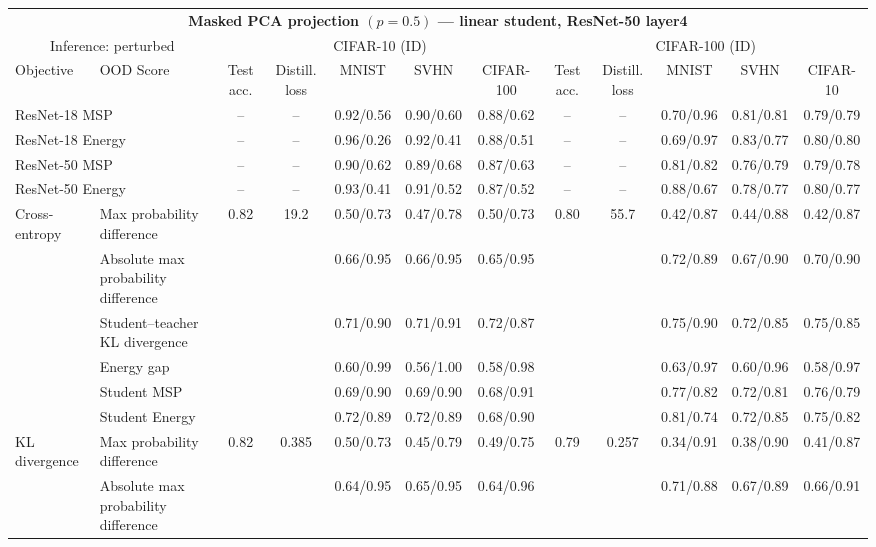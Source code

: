 \documentclass[border=2pt]{standalone}
\begin{document}
\scriptsize
\setlength{\tabcolsep}{4pt}
\begin{tabular}{llcccccccccc}
\multicolumn{12}{c}{\textbf{Masked PCA projection $(p=0.5)$ --- linear student, ResNet-50 layer4}}\\[4pt]
\multicolumn{2}{c}{Inference: perturbed} & \multicolumn{5}{c}{CIFAR-10 (ID)} & \multicolumn{5}{c}{CIFAR-100 (ID)} \\
\cmidrule(lr){3-7} \cmidrule(lr){8-12}
\toprule
Objective & OOD Score & Test acc. & Distill. loss & MNIST & SVHN & CIFAR-100 & Test acc. & Distill. loss & MNIST & SVHN & CIFAR-10 \\
\midrule
\multicolumn{2}{l}{ResNet-18 MSP} & -- & -- & 0.92/0.56 & 0.90/0.60 & 0.88/0.62 & -- & -- & 0.70/0.96 & 0.81/0.81 & 0.79/0.79 \\
\multicolumn{2}{l}{ResNet-18 Energy} & -- & -- & 0.96/0.26 & 0.92/0.41 & 0.88/0.51 & -- & -- & 0.69/0.97 & 0.83/0.77 & 0.80/0.80 \\
\multicolumn{2}{l}{ResNet-50 MSP} & -- & -- & 0.90/0.62 & 0.89/0.68 & 0.87/0.63 & -- & -- & 0.81/0.82 & 0.76/0.79 & 0.79/0.78 \\
\multicolumn{2}{l}{ResNet-50 Energy} & -- & -- & 0.93/0.41 & 0.91/0.52 & 0.87/0.52 & -- & -- & 0.88/0.67 & 0.78/0.77 & 0.80/0.77 \\
\midrule
Cross-entropy & Max probability difference & 0.82 & 19.2 & 0.50/0.73 & 0.47/0.78 & 0.50/0.73 & 0.80 & 55.7 & 0.42/0.87 & 0.44/0.88 & 0.42/0.87 \\
 & Absolute max probability difference &  &  & 0.66/0.95 & 0.66/0.95 & 0.65/0.95 &  &  & 0.72/0.89 & 0.67/0.90 & 0.70/0.90 \\
 & Student--teacher KL divergence &  &  & 0.71/0.90 & 0.71/0.91 & 0.72/0.87 &  &  & 0.75/0.90 & 0.72/0.85 & 0.75/0.85 \\
 & Energy gap &  &  & 0.60/0.99 & 0.56/1.00 & 0.58/0.98 &  &  & 0.63/0.97 & 0.60/0.96 & 0.58/0.97 \\
 & Student MSP &  &  & 0.69/0.90 & 0.69/0.90 & 0.68/0.91 &  &  & 0.77/0.82 & 0.72/0.81 & 0.76/0.79 \\
 & Student Energy &  &  & 0.72/0.89 & 0.72/0.89 & 0.68/0.90 &  &  & 0.81/0.74 & 0.72/0.85 & 0.75/0.82 \\
\addlinespace
KL divergence & Max probability difference & 0.82 & 0.385 & 0.50/0.73 & 0.45/0.79 & 0.49/0.75 & 0.79 & 0.257 & 0.34/0.91 & 0.38/0.90 & 0.41/0.87 \\
 & Absolute max probability difference &  &  & 0.64/0.95 & 0.65/0.95 & 0.64/0.96 &  &  & 0.71/0.88 & 0.67/0.89 & 0.66/0.91 \\

\end{tabular}
\end{document}
